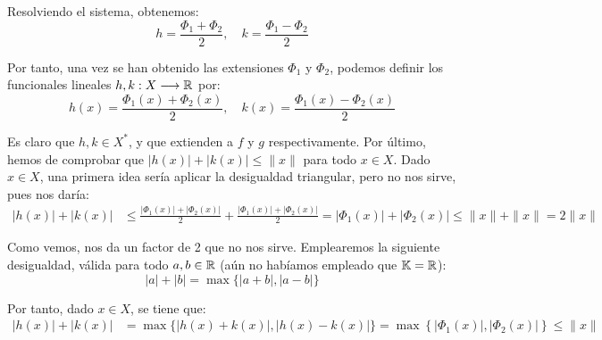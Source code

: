 \begin{ejercicio}
    Resolviendo el sistema, obtenemos:
    \begin{equation*}
        h = \frac{\Phi_1 + \Phi_2}{2}, \quad k = \frac{\Phi_1 - \Phi_2}{2}
    \end{equation*}

    Por tanto, una vez se han obtenido las extensiones $\Phi_1$ y $\Phi_2$, podemos definir los funcionales lineales $h, k: X \longrightarrow \mathbb{R}$ por:
    \begin{equation*}
        h(x) = \frac{\Phi_1(x) + \Phi_2(x)}{2}, \quad k(x) = \frac{\Phi_1(x) - \Phi_2(x)}{2}
    \end{equation*}

    Es claro que $h,k\in X^*$, y que extienden a $f$ y $g$ respectivamente. Por último, hemos de comprobar que $|h(x)| + |k(x)| \leq \|x\|$ para todo $x \in X$. Dado $x \in X$, una primera idea sería aplicar la desigualdad triangular, pero no nos sirve, pues nos daría:
    \begin{align*}
        |h(x)| + |k(x)| &\leq \frac{|\Phi_1(x)| + |\Phi_2(x)|}{2} + \frac{|\Phi_1(x)| + |\Phi_2(x)|}{2} = |\Phi_1(x)| + |\Phi_2(x)| \leq \|x\| + \|x\| = 2\|x\|
    \end{align*}

    Como vemos, nos da un factor de 2 que no nos sirve. Emplearemos la siguiente desigualdad, válida para todo $a, b \in \mathbb{R}$ (aún no habíamos empleado que $\mathbb{K} = \mathbb{R}$):
    \begin{equation*}
        |a| + |b| = \max\{|a + b|, |a - b|\}
    \end{equation*}

    Por tanto, dado $x \in X$, se tiene que:
    \begin{align*}
        |h(x)| + |k(x)| &= \max\{|h(x) + k(x)|, |h(x) - k(x)|\} = \max\left\{\left|\Phi_1(x)\right|, \left|\Phi_2(x)\right|\right\} \leq \|x\|
    \end{align*}
\end{ejercicio}

